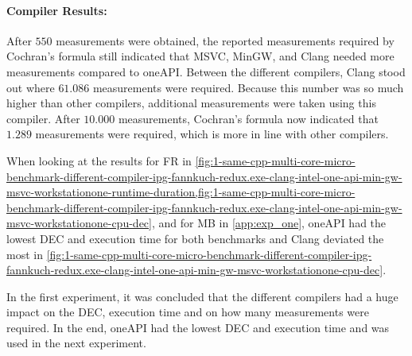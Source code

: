 % 

\paragraph{Compiler Results:} After $550$ measurements were obtained, the reported measurements required by Cochran's formula still indicated that MSVC, MinGW, and Clang needed more measurements compared to oneAPI. Between the different compilers, Clang stood out where $61.086$ measurements were required. Because this number was so much higher than other compilers, additional measurements were taken using this compiler. After $10.000$ measurements, Cochran's formula now indicated that $1.289$ measurements were required, which is more in line with other compilers.


When looking at the results for FR in \cref{fig:1-same-cpp-multi-core-micro-benchmark-different-compiler-ipg-fannkuch-redux.exe-clang-intel-one-api-min-gw-msvc-workstationone-runtime-duration,fig:1-same-cpp-multi-core-micro-benchmark-different-compiler-ipg-fannkuch-redux.exe-clang-intel-one-api-min-gw-msvc-workstationone-cpu-dec}, and for MB in \cref{app:exp_one}, oneAPI had the lowest DEC and execution time for both benchmarks and Clang deviated the most in \cref{fig:1-same-cpp-multi-core-micro-benchmark-different-compiler-ipg-fannkuch-redux.exe-clang-intel-one-api-min-gw-msvc-workstationone-cpu-dec}.

In the first experiment, it was concluded that the different compilers had a huge impact on the DEC, execution time and on how many measurements were required. In the end, oneAPI had the lowest DEC and execution time and was used in the next experiment.

